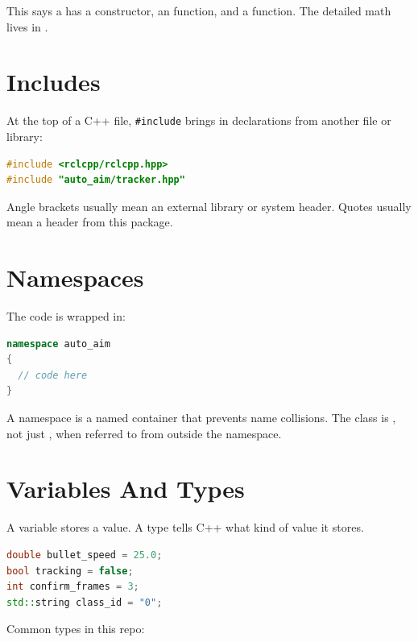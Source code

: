 This says a  has a constructor, an  function, and a
 function. The detailed math lives in .

\section{Includes}

At the top of a C++ file, \texttt{\#include} brings in declarations from another
file or library:

\begin{lstlisting}[language=C++]
#include <rclcpp/rclcpp.hpp>
#include "auto_aim/tracker.hpp"
\end{lstlisting}

Angle brackets usually mean an external library or system header. Quotes
usually mean a header from this package.

\section{Namespaces}

The code is wrapped in:

\begin{lstlisting}[language=C++]
namespace auto_aim
{
  // code here
}
\end{lstlisting}

A namespace is a named container that prevents name collisions. The class is
, not just , when referred to from
outside the namespace.

\section{Variables And Types}

A variable stores a value. A type tells C++ what kind of value it stores.

\begin{lstlisting}[language=C++]
double bullet_speed = 25.0;
bool tracking = false;
int confirm_frames = 3;
std::string class_id = "0";
\end{lstlisting}

Common types in this repo:

